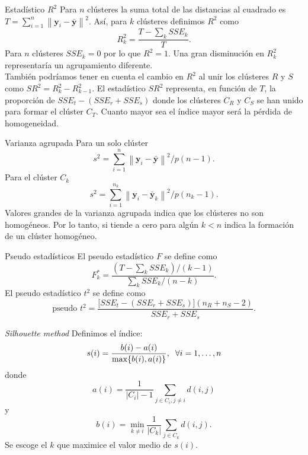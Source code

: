 \documentclass[spanish]{beamer}
\newcommand{\norm}[1]{\left\lVert#1\right\rVert}
\newcommand{\yy}{\textbf{y}}
\begin{document}
\begin{frame}{Estadístico $ R^2 $}
	Para $ n $ clústeres la suma total de las distancias al cuadrado es $ T = \sum_{i = 1}^{n} \norm{\yy_i - \bar{\yy}}^2 $. Así, para $ k $ clústeres definimos $ R^2 $ como
	\[
	R^{2}_{k} = \frac{T - \sum_k SSE_k}{T}.
	\]
	Para $ n $ clústeres $ SSE_k = 0 $ por lo que $ R^2 = 1 $. Una gran disminución en $ R^2_k $ representaría un agrupamiento diferente. \\
	También podríamos tener en cuenta el cambio en $ R^2 $ al unir los clústeres $ R $ y $ S $ como $ SR^2 = R_k^2 - R^2_{k-1} $. El estadístico $ SR^2 $ representa, en función de $ T $, la proporción de $ SSE_t - (SSE_r + SSE_s) $ donde los clústeres $ C_R $ y $ C_S $ se han unido para formar el clúster $ C_T $.  Cuanto mayor sea el índice mayor será la pérdida de homogeneidad.
\end{frame}

\begin{frame}{Varianza agrupada}
	Para un solo clúster \[ s^2 = \sum_{i=1}^{n} \norm{\yy_i - \bar{\yy}}^2/ p(n-1).\]
	Para el clúster $ C_k $
	\[
	s^2 = \sum_{i=1}^{n_k} \norm{\yy_i - \bar{\yy}_k}^2/ p(n_k-1).
	\]
	Valores grandes de la varianza agrupada indica que los clústeres no son homogéneos. Por lo tanto, si tiende a cero para algún $  k < n $ indica la formación de un clúster homogéneo.
\end{frame}

\begin{frame}{Pseudo estadísticos}
	El pseudo estadístico $ F $ se define como
	\[
	F^*_k = \frac{(T-\sum_k SSE_k) / (k-1)}{\sum_k SSE_k / (n-k)}.
	\]
	El pseudo estadístico $ t^2 $ se define como
	\[
	\text{pseudo }t^2 = \frac{\lbrack SSE_t - (SSE_r + SSE_s)\rbrack(n_R + n_S - 2)}{SSE_r + SSE_s}.
	\]
\end{frame}

\begin{frame}{\textit{Silhouette method}}
	Definimos el índice:
	\[
	s(i) = \frac{b(i)-a(i)}{\max\{b(i), a(i)\}}, \hspace{2mm} \forall i = 1, \dots, n
	\] 
	donde 
	\[
	a(i) = \frac{1}{|C_i|-1}\sum_{j\in C_i, j \neq i} d(i,j) 
	\]	y
	\[
	b(i) = \min_{k \neq i} \frac{1}{|C_k|} \sum_{j \in C_k} d(i,j).
	\] 
	Se escoge el $ k $ que maximice el valor medio de $ s(i) $.
\end{frame}
\end{document}
